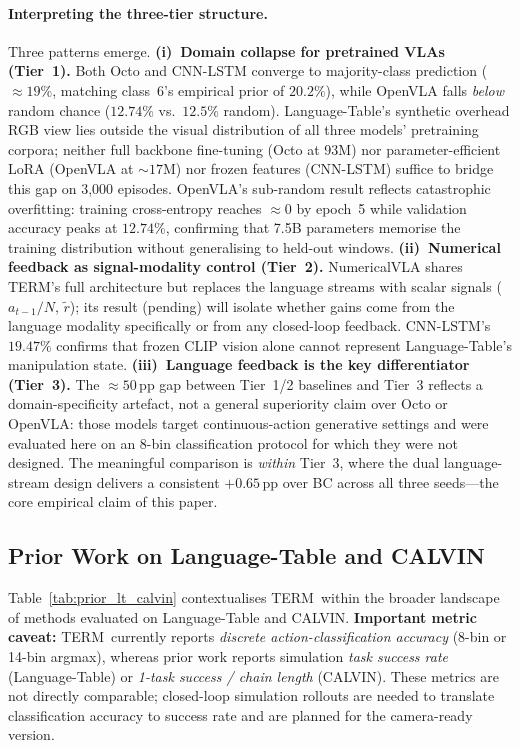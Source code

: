 \documentclass{article}
\newcommand{\modelname}{\textsc{TERM}\xspace}
\begin{document}
\paragraph{Interpreting the three-tier structure.}
Three patterns emerge.
\textbf{(i)~Domain collapse for pretrained VLAs (Tier~1).}
Both Octo and CNN-LSTM converge to majority-class prediction (${\approx}19\%$,
matching class~6's empirical prior of $20.2\%$), while OpenVLA falls
\emph{below} random chance ($12.74\%$ vs.\ $12.5\%$ random).
Language-Table's synthetic overhead RGB view lies outside the visual
distribution of all three models' pretraining corpora;
neither full backbone fine-tuning (Octo at 93M) nor parameter-efficient LoRA
(OpenVLA at ${\sim}17$M) nor frozen features (CNN-LSTM) suffice to bridge
this gap on 3{,}000 episodes.
OpenVLA's sub-random result reflects catastrophic overfitting:
training cross-entropy reaches ${\approx}0$ by epoch~5
while validation accuracy peaks at $12.74\%$,
confirming that 7.5B parameters memorise the training distribution
without generalising to held-out windows.
\textbf{(ii)~Numerical feedback as signal-modality control (Tier~2).}
NumericalVLA shares \modelname's full architecture but replaces the language
streams with scalar signals ($a_{t-1}/N,\,\tilde{r}$); its result (pending)
will isolate whether gains come from the language modality specifically
or from any closed-loop feedback.
CNN-LSTM's $19.47\%$ confirms that frozen CLIP vision alone cannot
represent Language-Table's manipulation state.
\textbf{(iii)~Language feedback is the key differentiator (Tier~3).}
The ${\approx}50$\,pp gap between Tier~1/2 baselines and Tier~3 reflects a
domain-specificity artefact, not a general superiority claim over Octo or OpenVLA:
those models target continuous-action generative settings and were evaluated
here on an 8-bin classification protocol for which they were not designed.
The meaningful comparison is \emph{within} Tier~3, where the dual
language-stream design delivers a consistent $+0.65$\,pp over BC
across all three seeds---the core empirical claim of this paper.

\subsection{Prior Work on Language-Table and CALVIN}
\label{sec:prior_comparison}

Table~\ref{tab:prior_lt_calvin} contextualises \modelname\ within the broader
landscape of methods evaluated on Language-Table and CALVIN.
\textbf{Important metric caveat:} \modelname\ currently reports
\emph{discrete action-classification accuracy} (8-bin or 14-bin argmax),
whereas prior work reports simulation \emph{task success rate} (Language-Table)
or \emph{1-task success / chain length} (CALVIN).
These metrics are not directly comparable; closed-loop simulation rollouts
are needed to translate classification accuracy to success rate and are
planned for the camera-ready version.
\end{document}
